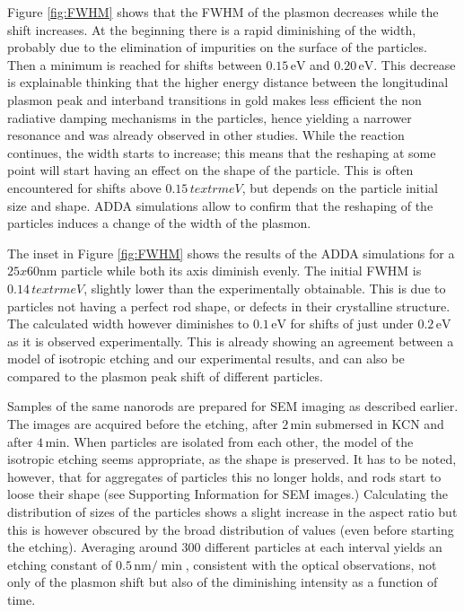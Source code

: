 \documentclass{article}
\begin{document}
Figure \ref{fig:FWHM} shows that the FWHM of the plasmon decreases while the
shift increases. At the beginning there is a rapid diminishing of the width,
probably due to the elimination of impurities on the surface of the particles.
Then a minimum is reached for shifts between $0.15\,\textrm{eV}$ and
$0.20\,\textrm{eV}$. This decrease is explainable thinking that the higher 
energy distance between the longitudinal plasmon peak and interband transitions
in gold makes less efficient the non radiative damping mechanisms in the
particles, hence yielding a narrower resonance and was already observed in
other studies\cite{Sonnichsen2002}. While the reaction continues, the width
starts to increase; this means that the reshaping at some point will start having an
effect on the shape of the particle. This is often encountered for shifts above
$0.15\,textrm{eV}$, but depends on the particle initial size and shape. ADDA
simulations allow to confirm that the reshaping of the particles induces a
change of the width of the plasmon.







The inset in Figure \ref{fig:FWHM} shows the results of the
ADDA\cite{Yurkin2011} simulations for a $25x60$nm particle while both its axis
diminish evenly. The initial FWHM is $0.14\,textrm{eV}$, slightly lower
than the experimentally obtainable. This is due to particles not having a
perfect rod shape, or defects in their crystalline structure. The calculated
width however diminishes to $0.1\,\textrm{eV}$ for shifts of just under
$0.2\,\textrm{eV}$ as it is observed experimentally. This is already showing an
agreement between a model of isotropic etching and our experimental results, and
can also be compared to the plasmon peak shift of different particles.



Samples of the same nanorods are prepared for SEM imaging as described earlier.
The images are acquired before the etching, after $2\,\textrm{min}$ submersed in
KCN and after $4\,\textrm{min}$. When particles are isolated from each other,
the model of the isotropic etching seems appropriate, as the shape is preserved.
It has to be noted, however, that for aggregates of particles this no longer
holds, and rods start to loose their shape (see Supporting Information for SEM
images.) Calculating the distribution of sizes of the particles shows a slight
increase in the aspect ratio but this is however obscured by the broad
distribution of values (even before starting the etching). Averaging around
$300$ different particles at each interval yields an etching constant of
$0.5\,\textrm{nm}/\min$, consistent with the optical observations, not only of
the plasmon shift but also of the diminishing intensity as a function of time. 
\end{document}
